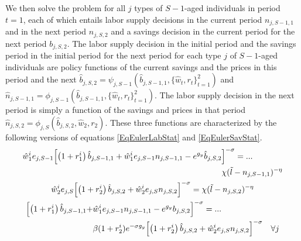 \documentclass[letterpaper,12pt]{article}
\theoremstyle{definition}
\begin{document}
  We then solve the problem for all $j$ types of $S-1$-aged individuals in period $t=1$, each of which entails labor supply decisions in the current period $n_{j,S-1,1}$ and in the next period $n_{j,S,2}$ and a savings decision in the current period for the next period $b_{j,S,2}$. The labor supply decision in the initial period and the savings period in the initial period for the next period for each type $j$ of $S-1$-aged individuals are policy functions of the current savings and the prices in this period and the next $\hat{b}_{j,S,2} = \psi_{j,S-1}(\hat{b}_{j,S-1,1},\{\hat{w}_t,r_t\}_{t=1}^2)$ and $\hat{n}_{j,S-1,1} = \phi_{j,S-1}(\hat{b}_{j,S-1,1},\{\hat{w}_t,r_t\}_{t=1}^2)$. The labor supply decision in the next period is simply a function of the savings and prices in that period $\hat{n}_{j,S,2} = \phi_{j,S}(\hat{b}_{j,S,2},\hat{w}_2,r_2)$. These three functions are characterized by the following versions of equations \eqref{EqEulerLabStat} and \eqref{EqEulerSavStat}.
  \begin{gather}
    \begin{split}
      \hat{w}^i_1 e_{j,S-1}\Bigl[\left(1+r^i_1\right)\hat{b}_{j,S-1,1} + \hat{w}^i_1 e_{j,S-1}n_{j,S-1,1} - e^{g_y}\hat{b}_{j,S,2}&\Bigr]^{-\sigma} = ... \\
      &\chi(\tilde{l} - n_{j,S-1,1})^{-\eta}
    \end{split} \label{EqEulerSm1labt1} \\
    \hat{w}^i_2 e_{j,S}\Bigl[\left(1+r^i_2\right)\hat{b}_{j,S,2} + \hat{w}^i_2 e_{j,S}n_{j,S,2}\Bigr]^{-\sigma} = \chi(\tilde{l} - n_{j,S,2})^{-\eta} \label{EqEulerSlabt2} \\
    \begin{split}
      \Bigl[\left(1+r^i_1\right)\hat{b}_{j,S-1,1} + &\hat{w}^i_1 e_{j,S-1}n_{j,S-1,1} - e^{g_y}b_{j,S,2}\Bigr]^{-\sigma} = ... \\
      &\beta(1+r^i_2)e^{-\sigma g_y}\Bigl[\left(1+r^i_2\right)\hat{b}_{j,S,2} + \hat{w}^i_2 e_{j,S}n_{j,S,2}\Bigr]^{-\sigma} \quad\forall j
    \end{split}\label{EqEulerSm1savt1}
  \end{gather}
\end{document}
